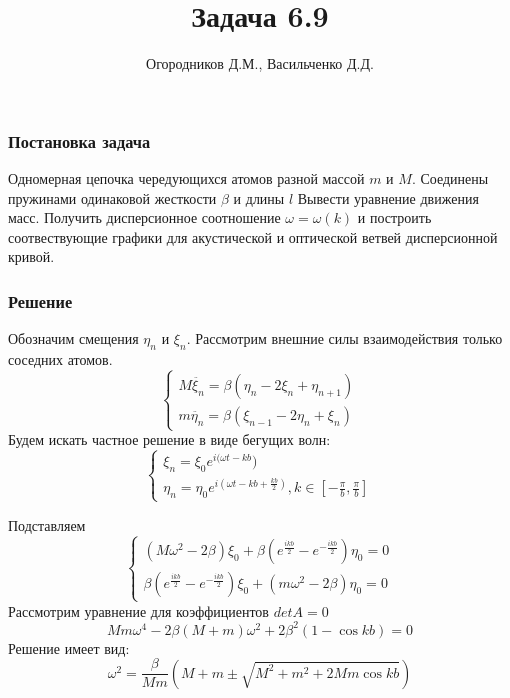 \documentclass{beamer}
\title{Задача 6.9}
\author{Огородников Д.М., Васильченко Д.Д.}
\institute{МГУ им. М.В. Ломоносова}
\begin{document}
	
\begin{frame}
	\titlepage	
\end{frame}
\begin{frame}
	\frametitle{Постановка задача}
	Одномерная цепочка чередующихся атомов разной массой $m$ и $M$. Соединены пружинами одинаковой жесткости $\beta$ и длины $l$ \newline
	Вывести уравнение движения масс. Получить дисперсионное соотношение $\omega = \omega(k)$ и построить соотвествующие графики для акустической и оптической ветвей дисперсионной кривой.
\end{frame}
\begin{frame}
	\frametitle{Решение}
	Обозначим смещения $\eta_n$  и $\xi_n$. Рассмотрим внешние силы взаимодействия только соседних атомов.
	\begin{equation*}
		\begin{cases}
			M \ddot{\xi_n} = \beta (\eta_n - 2\xi_n + \eta_{n+1}) \\
			m \ddot{\eta_n} = \beta(\xi_{n-1} - 2\eta_n + \xi_n)
		\end{cases}
	\end{equation*}
	Будем искать частное решение в виде бегущих волн:
	\begin{equation*}
		\begin{cases}	
			\xi_n = \xi_0 e^{i(\omega t - kb}) \\
			\eta_n = \eta_0 e^{i(\omega t - kb + \frac{kb}{2})},  k \in [-\frac\pi{b}, \frac\pi{b}]
		\end{cases}	
	\end{equation*}
\end{frame}
\begin{frame}
	Подставляем
	\begin{equation*}
		\begin{cases}
			(M \omega^2 - 2 \beta) \xi_0 + \beta (e^{\frac{ikb}{2}} - e^{-\frac{ikb}{2}}) \eta_0 = 0 \\
			\beta (e^{\frac{ikb}{2}} - e^{-\frac{ikb}{2}}) \xi_0 + (m\omega^2 - 2 \beta) \eta_0 = 0
		\end{cases}
	\end{equation*}
	Рассмотрим уравнение для коэффициентов $det A = 0$
	\begin{equation*}
		Mm\omega^4 -2 \beta (M + m) \omega^2 + 2 \beta^2 (1 - \cos{kb}) = 0	
	\end{equation*}
	Решение имеет вид: 
	\begin{equation*}
		\omega^2 = \frac{\beta}{Mm} \left(M + m \pm \sqrt{M^2 + m^2 + 2 M m \cos{kb}}\right)
	\end{equation*}

\end{frame}
\end{document}
